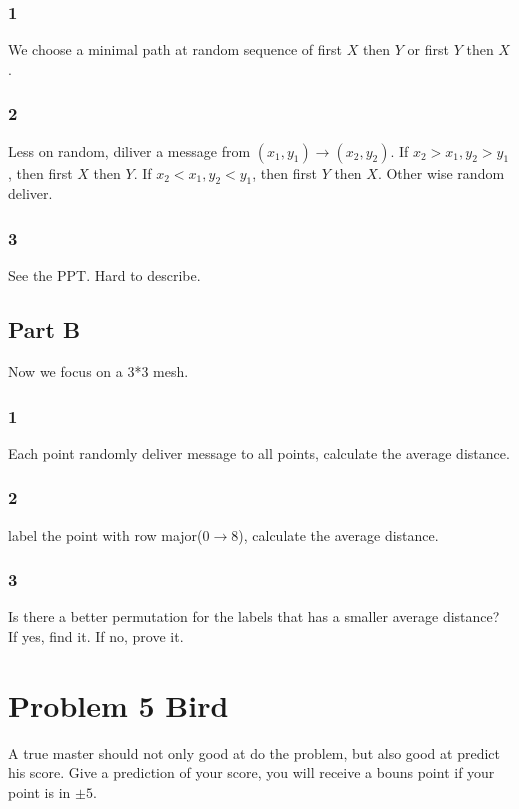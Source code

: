 \documentclass{article}
\begin{document}
\subsubsection*{1}
We choose a minimal path at random sequence of first $X$ then $Y$ or first $Y$ then $X$.
\subsubsection*{2}
Less on random, diliver a message from $(x_1,y_1)\to(x_2,y_2)$. If $x_2>x_1,y_2>y_1$, then first $X$ then $Y$. If $x_2<x_1,y_2<y_1$, then first $Y$ then $X$. Other wise random deliver.
\subsubsection*{3}
See the PPT. Hard to describe.
\subsection*{Part B}
Now we focus on a 3*3 mesh.
\subsubsection*{1}
Each point randomly deliver message to all points, calculate the average distance.
\subsubsection*{2}
label the point with row major($0\to 8$), calculate the average distance.
\subsubsection*{3}
Is there a better permutation for the labels that has a smaller average distance? If yes, find it. If no, prove it.
\section*{Problem 5 Bird}
A true master should not only good at do the problem, but also good at predict his score. Give a prediction of your score, you will receive a bouns point if your point is in $\pm 5$.\\
\end{document}
